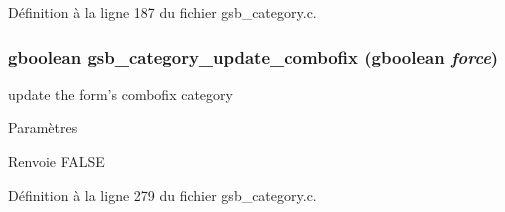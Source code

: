 Définition à la ligne 187 du fichier gsb\_\-category.c.

\subsubsection[{gsb\_\-category\_\-update\_\-combofix}]{\setlength{\rightskip}{0pt plus 5cm}gboolean gsb\_\-category\_\-update\_\-combofix (gboolean {\em force})}\label{gsb__category_8h_a4425cec992b659cc95662174b1879e04}
update the form's combofix category


\begin{DoxyParams}{Paramètres}
\item[{\em }]\end{DoxyParams}
\begin{DoxyReturn}{Renvoie}
FALSE 
\end{DoxyReturn}


Définition à la ligne 279 du fichier gsb\_\-category.c.

